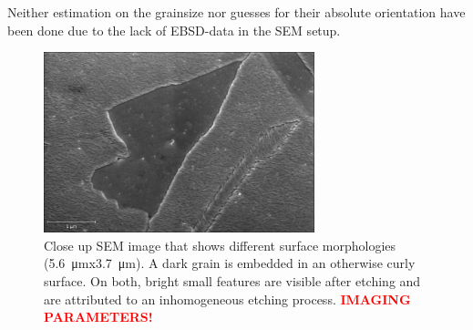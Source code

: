	Neither estimation on the grainsize nor guesses for their absolute orientation have been done due to the lack of EBSD-data in the SEM setup.
	
	\begin{figure}[] \centering
		\includegraphics[width=0.7\textwidth]{./images/Domenik_16031700.jpg}
		\caption{Close up SEM image that shows different surface morphologies (\SI{5.6}{\micro \meter}x\SI{3.7}{\micro \meter}). A dark grain is embedded in an otherwise curly surface. On both, bright small features are visible after etching and are attributed to an inhomogeneous etching process. \textcolor{red}{\textbf{IMAGING PARAMETERS!}}}
		\label{fig:SEM-surface}
	\end{figure}
	
